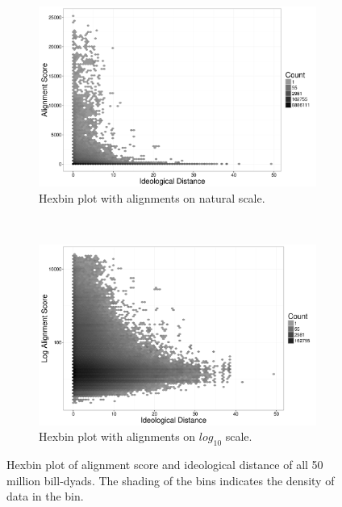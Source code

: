 \documentclass[12pt]{article} %
\begin{document}
\begin{figure}[ht!]
    \centering
    \begin{subfigure}[t]{0.5\textwidth}
        \centering
        \includegraphics[width=\textwidth]{figures/ideology_plot.png}
        \caption{Hexbin plot with alignments on natural scale.}
    \end{subfigure}%
    ~ 
    \begin{subfigure}[t]{0.5\textwidth}
        \centering
        \includegraphics[width=\textwidth]{figures/ideology_plot_log.png}
        \caption{Hexbin plot with alignments on $log_{10}$ scale.}
    \end{subfigure}
    \caption{Hexbin plot of alignment score and ideological distance of all 50
    million bill-dyads. The shading of the bins indicates the density of data in
    the bin.}
    \label{fig:ideology_plot}
\end{figure}
\end{document}

